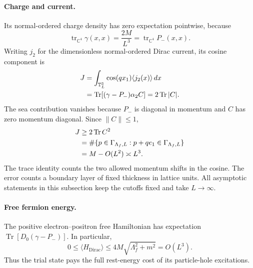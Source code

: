 \paragraph{Charge and current.}
Its normal-ordered charge density has zero expectation pointwise, because
\begin{equation}
 \operatorname{tr}_{\mathbb C^4}\gamma(x,x)
 =\frac{2M}{L^3}
 =\operatorname{tr}_{\mathbb C^4}P_-(x,x).
 \label{app-qed:neutral-density}
\end{equation}
Writing \(j_2\) for the dimensionless normal-ordered Dirac current, its cosine component is
\begin{align}
 J&=\int_{\mathbb T_L^3}\cos(qx_1)\langle j_2(x)\rangle\,dx\notag\\
  &=\operatorname{Tr}[(\gamma-P_-)\alpha_2 C]
   =2\operatorname{Tr}|C|.
 \label{app-qed:current}
\end{align}
The sea contribution vanishes because \(P_-\) is diagonal in momentum and \(C\) has zero momentum diagonal. Since \(\|C\|\leq1\),
\begin{align}
 J&\geq2\operatorname{Tr}C^2\notag\\
  &=\#\{p\in\Gamma_{\Lambda_f,L}:p+qe_1\in\Gamma_{\Lambda_f,L}\}\notag\\
  &=M-O(L^2)\asymp L^3.
 \label{app-qed:current-size}
\end{align}
The trace identity counts the two allowed momentum shifts in the cosine. The error counts a boundary layer of fixed thickness in lattice units. All asymptotic statements in this subsection keep the cutoffs fixed and take \(L\to\infty\).

\paragraph{Free fermion energy.}
The positive electron--positron free Hamiltonian has expectation
\(\operatorname{Tr}[D_0(\gamma-P_-)]\). In particular,
\begin{equation}
 0\leq\langle H_{\mathrm{Dirac}}\rangle
 \leq4M\sqrt{\Lambda_f^2+m^2}=O(L^3).
 \label{app-qed:free-cost}
\end{equation}
Thus the trial state pays the full rest-energy cost of its particle-hole excitations.

